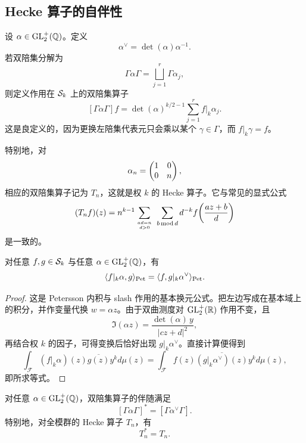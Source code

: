 \subsection{Hecke 算子的自伴性}

设 $\alpha\in \mathrm{GL}_2^+(\mathbb{Q})$。定义
\[
\alpha^{\vee}=\det(\alpha)\alpha^{-1}.
\]
若双陪集分解为
\[
\Gamma\alpha\Gamma=\bigsqcup_{j=1}^r \Gamma\alpha_j,
\]
则定义作用在 $\mathcal{S}_k$ 上的双陪集算子
\[
[\Gamma\alpha\Gamma]f=\det(\alpha)^{k/2-1}\sum_{j=1}^r f|_k\alpha_j.
\]
这是良定义的，因为更换左陪集代表元只会乘以某个 $\gamma\in\Gamma$，而 $f|_k\gamma=f$。

特别地，对
\[
\alpha_n=\begin{pmatrix} 1&0\\0&n \end{pmatrix},
\]
相应的双陪集算子记为 $T_n$，这就是权 $k$ 的 Hecke 算子。它与常见的显式公式
\[
(T_nf)(z)=n^{k-1}\sum_{ad=n\atop d>0}\ \sum_{b\,\mathrm{mod}\,d} d^{-k} f\!\left(\frac{az+b}{d}\right)
\]
是一致的。

\begin{lemma}
对任意 $f,g\in \mathcal{S}_k$ 与任意 $\alpha\in \mathrm{GL}_2^+(\mathbb{Q})$，有
\[
\langle f|_k\alpha, g \rangle_{\mathrm{Pet}}=\langle f, g|_k\alpha^{\vee} \rangle_{\mathrm{Pet}}.
\]
\end{lemma}

\begin{proof}
这是 Petersson 内积与 slash 作用的基本换元公式。把左边写成在基本域上的积分，并作变量代换 $w=\alpha z$。由于双曲测度对 $\mathrm{GL}_2^+(\mathbb{R})$ 作用不变，且
\[
\Im(\alpha z)=\frac{\det(\alpha)\,y}{|cz+d|^2},
\]
再结合权 $k$ 的因子，可得变换后恰好出现 $g|_k\alpha^{\vee}$。直接计算便得到
\[
\int_{\mathcal{F}} (f|_k\alpha)(z)\overline{g(z)}y^k d\mu(z)
=
\int_{\mathcal{F}} f(z)\overline{(g|_k\alpha^{\vee})(z)}y^k d\mu(z),
\]
即所求等式。
\end{proof}

\begin{theorem}
对任意 $\alpha\in \mathrm{GL}_2^+(\mathbb{Q})$，双陪集算子的伴随满足
\[
[\Gamma\alpha\Gamma]^*=[\Gamma\alpha^{\vee}\Gamma].
\]
特别地，对全模群的 Hecke 算子 $T_n$，有
\[
T_n^*=T_n.
\]
\end{theorem}


